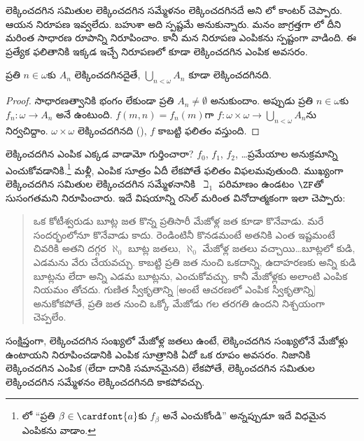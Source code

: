 \documentclass[../../../include/open-logic-section]{subfiles}
\begin{document}
\begin{ex}
లెక్కించదగిన సమితుల లెక్కించదగిన సమ్మేళనం లెక్కించదగినదే అని \citeyear{Cantor1878}లో కాంటర్ చెప్పారు. ఆయన నిరూపణ ఇవ్వలేదు. బహుశా అది స్పష్టమే అనుకున్నారు. మనం జాగ్రత్తగా లో దీని మరింత సాధారణ రూపాన్ని నిరూపించాం. కానీ మన నిరూపణ ఎంపికను స్పష్టంగా వాడింది. ఈ ప్రత్యేక ఫలితానికి ఇక్కడ ఇచ్చే నిరూపణలో కూడా లెక్కించదగిన ఎంపిక అవసరం.

\begin{thm}
ప్రతి $n \in \omega$కు $A_n$ లెక్కించదగినదైతే, $\bigcup_{n <
\omega} A_n$ కూడా లెక్కించదగినది.
\end{thm}

\begin{proof}
సాధారణత్వానికి భంగం లేకుండా ప్రతి $A_n \neq \emptyset$ అనుకుందాం. అప్పుడు ప్రతి $n \in \omega$కు $f_n \colon \omega
\to A_n$ అనే  ఉంటుంది. $f(m, n) = f_n(m)$గా $f \colon \omega \times \omega \to \bigcup_{n <
\omega} A_n$ను నిర్వచిద్దాం. $\omega
\times \omega$ లెక్కించదగినది (), $f$  కాబట్టి ఫలితం వస్తుంది.
\end{proof}
\noindent
లెక్కించదగిన ఎంపిక ఎక్కడ వాడామో గుర్తించారా? $f_0$, $f_1$, $f_2$, \dots\@ ప్రమేయాల అనుక్రమాన్ని ఎంచుకోవడానికి.\footnote{లో ``ప్రతి $\beta \in \cardfont{a}$కు $f_\beta$ అనే  ఎంచుకోండి'' అన్నప్పుడూ ఇదే విధమైన ఎంపికను వాడాం.} మళ్లీ, ఎంపిక సూత్రం ఏదీ లేకపోతే ఫలితం విఫలమవుతుంది. ముఖ్యంగా లెక్కించదగిన సమితుల లెక్కించదగిన సమ్మేళనానికి~$\beth_1$ పరిమాణం ఉండటం $\ZF$తో సుసంగతమని \citet{FefermanLevy1963} నిరూపించారు. ఇదే విషయాన్ని రసెల్ మరింత వినోదాత్మకంగా ఇలా చెప్పారు:
\begin{quote}
  ఒక కోటీశ్వరుడు బూట్ల జత కొన్న ప్రతిసారీ మేజోళ్ల జత కూడా కొనేవాడు. మరే సందర్భంలోనూ కొనేవాడు కాదు. రెండింటినీ కొనడమంటే అతనికి ఎంత ఇష్టమంటే చివరికి అతని దగ్గర $\aleph_0$ బూట్ల జతలు, $\aleph_0$ మేజోళ్ల జతలు వచ్చాయి\dots\@ బూట్లలో కుడి, ఎడమను వేరు చేయవచ్చు. కాబట్టి ప్రతి జత నుంచి ఒకదాన్ని, ఉదాహరణకు అన్ని కుడి బూట్లను లేదా అన్ని ఎడమ బూట్లను, ఎంచుకోవచ్చు. కానీ మేజోళ్లకు అలాంటి ఎంపిక నియమం తోచదు. గుణిత స్వీకృతాన్ని [అంటే ఆచరణలో ఎంపిక స్వీకృతాన్ని] అనుకోకపోతే, ప్రతి జత నుంచి ఒక్కో మేజోడు గల తరగతి ఉందని నిశ్చయంగా చెప్పలేం.
  \citep[p.~126]{Russell1919}
\end{quote}
సంక్షిప్తంగా, లెక్కించదగిన సంఖ్యలో మేజోళ్ల జతలు ఉంటే, లెక్కించదగిన సంఖ్యలోనే మేజోళ్లు ఉంటాయని నిరూపించడానికి ఎంపిక సూత్రానికి ఏదో ఒక రూపం అవసరం. నిజానికి లెక్కించదగిన ఎంపిక (లేదా దానికి సమానమైనది) లేకపోతే, లెక్కించదగిన సమితుల లెక్కించదగిన సమ్మేళనం లెక్కించదగినది కాకపోవచ్చు.
\end{ex}
\end{document}
